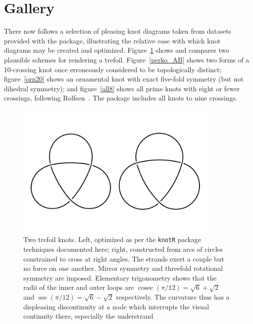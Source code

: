 \documentclass{birkjour}
\theoremstyle{definition}
\theoremstyle{remark}
\numberwithin{equation}{section}
\begin{document}
\clearpage
\section{Gallery}

There now follows a selection of pleasing knot diagrams taken from
datasets provided with the package, illustrating the relative ease
with which knot diagrams may be created and optimized.
Figure~\ref{two_trefoil_knots} shows and compares two plausible
schemes for rendering a trefoil.  Figure~\ref{perko_AB} shows two
forms of a 10-crossing knot once erroneously considered to be
topologically distinct; figure~\ref{orn20} shows an ornamental knot
with exact five-fold symmetry (but not dihedral symmetry); and
figure~\ref{all8} shows all prime knots with eight or fewer crossings,
following Rolfsen~\cite{rolfsen1976}.  The package includes all knots
to nine crossings.

\begin{figure}[h]
  \centering  
    \includegraphics[width=10cm]{two_trefoil_knots_post_inkscape.pdf}
    \caption{Two trefoil \label{two_trefoil_knots} knots.  Left,
      optimized as per the {\tt knotR} package techniques documented
      here; right, constructed from arcs of circles constrained to
      cross at right angles.  The strands exert a couple but no force
      on one another.  Mirror symmetry and threefold rotational
      symmetry are imposed.  Elementary trigonometry shows that the
      radii of the inner and outer loops are
      $\operatorname{cosec}(\pi/12)=\sqrt{6}+\sqrt{2}$ and
      $\sec(\pi/12)=\sqrt{6}-\sqrt{2}$ respectively.  The curvature
      thus has a displeasing discontinuity at a node which interrupts
      the visual continuity there, especially the understrand}
\end{figure}
\end{document}
